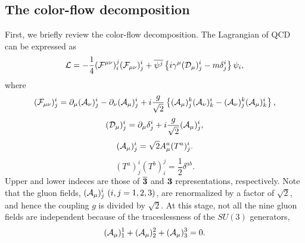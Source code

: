 \documentclass[a4paper,11pt]{article}
\begin{document}
\subsection{The color-flow decomposition}
First, we briefly review the color-flow decomposition. The Lagrangian of
QCD can be expressed as
\begin{equation}
 {\cal L}=-\frac{1}{4}({\cal F}^{\mu\nu})^j_i({\cal F}_{\mu\nu})^i_j
+\overline{\psi^j}\left\{i\gamma^{\mu}({\cal D}_{\mu})^i_j
-m\delta^i_j\right\}\psi_i,\label{lagrangian}
\end{equation}
where
\begin{equation}
 ({\cal F}_{\mu\nu})^i_j=\partial_{\mu}({\cal A}_{\nu})^i_j
-\partial_{\nu}({\cal A}_{\mu})^i_j+i\frac{g}{\sqrt{2}}\left\{({\cal A}_{\mu})^k_j
({\cal A}_{\nu})^i_k-({\cal A}_{\nu})^k_j
({\cal A}_{\mu})^i_k\right\},
  \end{equation}
\begin{equation}
 ({\cal
  D}_{\mu})^i_j=\partial_{\mu}\delta^i_j+i\frac{g}{\sqrt{2}}({\cal
  A}_{\mu})^i_j,
\end{equation}
\begin{equation}
 ({\cal A}_{\mu})^i_j=\sqrt{2}A_{\mu}^a(T^a)^i_j.
\end{equation}
\begin{equation}
 (T^a)^i_j(T^b)^j_i = \frac{1}{2}\delta^{ab}.
\end{equation}
Upper and lower indeces are those of ${\bf \overline{3}}$ and ${\bf 3}$
representations, respectively. Note that the gluon fields, $({\cal
A}_{\mu})^i_j\,\,(i,j=1, 2, 3)$, are renormalized by a
factor of $\sqrt{2}$, and hence the coupling $g$ is divided by
$\sqrt{2}$. At this stage, not all the nine gluon fields are independent
because of  the traceslessness of the $SU(3)$ generators,
\begin{equation}
({\cal A}_{\mu})^1_1 + ({\cal A}_{\mu})^2_2 + ({\cal A}_{\mu})^3_3 = 0.
\end{equation}
\end{document}
